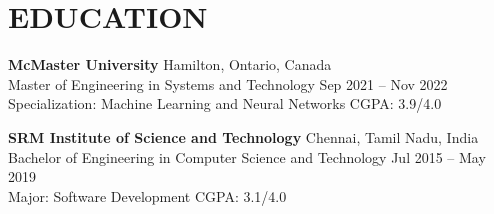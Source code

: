 \documentclass[10pt]{article}
\begin{document}
\section*{EDUCATION}
\textbf{McMaster University} \hfill Hamilton, Ontario, Canada \\
Master of Engineering in Systems and Technology \hfill Sep 2021 -- Nov 2022 \\
Specialization: Machine Learning and Neural Networks \hfill CGPA: 3.9/4.0

\vspace{3pt}
\textbf{SRM Institute of Science and Technology} \hfill Chennai, Tamil Nadu, India \\
Bachelor of Engineering in Computer Science and Technology \hfill Jul 2015 -- May 2019 \\
Major: Software Development \hfill CGPA: 3.1/4.0
\end{document}
